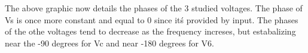 The above graphic now details the phases of the 3 studied voltages. The phase of Vs is once more constant and equal to 0 since itś provided by input. The phases of the othe voltages tend to decrease as the frequency increses, but estabalizing near the -90 degrees for Vc and near -180 degrees for V6.  




